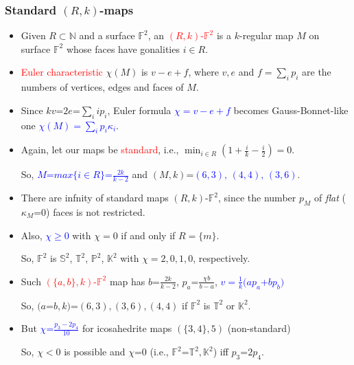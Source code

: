 \documentclass{beamer}
\begin{document}
\begin{frame}\frametitle{Standard $(R,k)$-maps}
\vspace{-3mm}
\begin{itemize}

\item Given $R\subset \mathbb{N}$ and a surface $\mathbb{F}^2$, an
\textcolor{red}{$(R,k)$-$\mathbb{F}^2$} is
a $k$-regular map $M$ on surface $\mathbb{F}^2$
whose faces have gonalities $i\in R$.

\item
\textcolor{red}{Euler characteristic} $\chi(M)$ is $v-e+f$, where $v,e$ and
$f=\sum_{i}p_i$ are the numbers of
vertices, edges and faces of $M$.
\item Since 
$kv$=$2e$=$\sum_{i}ip_i$, 
 Euler formula
\textcolor{blue}{$\chi=v-e+f$}
  becomes Gauss-Bonnet-like one
 \textcolor{blue}{$\chi(M)=\sum_{i}p_i\kappa_i$}.

\item
Again, let our
maps be
\textcolor{red}{standard}, i.e.,
$\min_{i\in R}(1+\frac{i}{k}-\frac{i}{2})=0$.

So,  
\textcolor{blue}{$M$=$max\{i\in R\}$=$\frac{2k}{k-2}$} 
and $(M,k)$=\textcolor{blue}{$(6,3),\,(4,4),\,(3,6)$}.


\item There are infnity of standard maps $(R,k)$-$\mathbb{F}^2$, since the 
number
$p_M$ of {\em flat} ($\kappa_M$=$0$) faces is not restricted.
\item 
Also, \textcolor{blue}{$\chi\ge 0$} with $\chi=0$ if and only if 
$R=\{m\}$. 

So, $\mathbb{F}^2$ is 
$\mathbb{S}^2$, $\mathbb{T}^2$, $\mathbb{P}^2$, $\mathbb{K}^2$
with  $\chi=2, 0, 1, 0$, respectively. 
 
\item Such \textcolor{red}{$(\{a,b\},k)$-$\mathbb{F}^2$}
map has $b$=$\frac{2k}{k-2}$,
 $p_a$=$\frac{\chi b}{b-a}$,
\textcolor{blue}{$v$$=$$\frac{1}{k}(ap_a$+$bp_b)$}

So, 
$(a$=$b,k)$=$(6,3),(3,6),(4,4)$ if $\mathbb{F}^2$ is $\mathbb{T}^2$ 
 or $\mathbb{K}^2$.
\item But \textcolor{blue}{$\chi$=$\frac{p_3-2p_4}{10}$} for icosahedrite 
maps $(\{3,4\},5)$ 
(non-standard)

So, $\chi$$<$$0$ is possible and 
$\chi$=$0$ (i.e., $\mathbb{F}^2$=$\mathbb{T}^2, \mathbb{K}^2$) iff
$p_3$=$2p_4$.



\end{itemize}
 
\end{frame}
 
\end{document}
